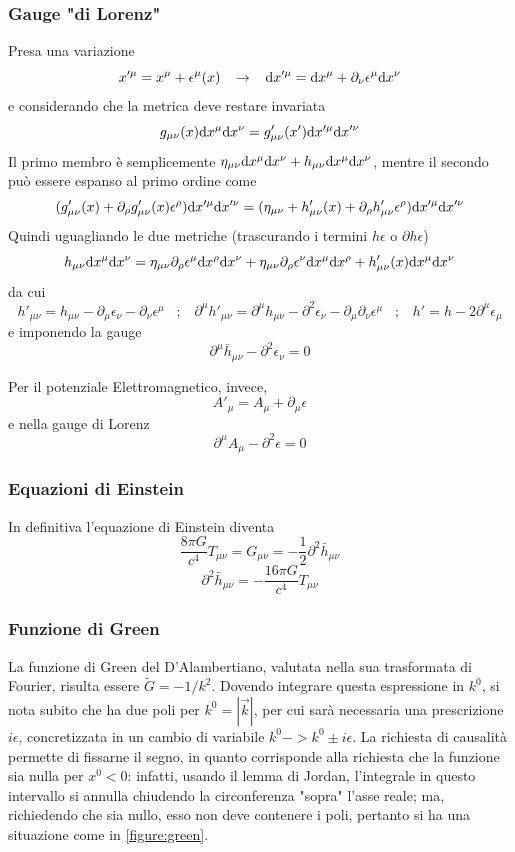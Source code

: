 \subsubsection{Gauge "di Lorenz"}
Presa una variazione
\[ x'^\mu = x^\mu +\epsilon^\mu(x) \;\;\;\rightarrow \;\;\; \mathrm{d} x'^\mu = \mathrm{d} x^\mu + \partial_\nu \epsilon^\mu \mathrm{d} x^\nu \]
e considerando che la metrica deve restare invariata
\[ g_{\mu\nu}(x)\mathrm{d} x^\mu\mathrm{d} x^\nu = g'_{\mu\nu}(x')\mathrm{d} x'^\mu\mathrm{d} x'^\nu \]
Il primo membro \`e semplicemente \( \eta_{\mu\nu} \mathrm{d} x^\mu\mathrm{d} x^\nu + h_{\mu\nu} \mathrm{d} x^\mu\mathrm{d} x^\nu \), mentre il secondo pu\`o essere espanso al primo ordine come
\[ (g'_{\mu\nu}(x)+\partial_\rho g'_{\mu\nu}(x) \epsilon^\rho)  \mathrm{d} x'^\mu\mathrm{d} x'^\nu = (\eta_{\mu\nu} + h'_{\mu\nu}(x) + \partial_\rho h'_{\mu\nu} \epsilon^\rho) \mathrm{d} x'^\mu\mathrm{d} x'^\nu \]
Quindi uguagliando le due metriche (trascurando i termini $h\epsilon$ o $\partial h\epsilon$)
\[ h_{\mu\nu} \mathrm{d} x^\mu\mathrm{d} x^\nu = \eta_{\mu\nu} \partial_\rho \epsilon^\mu \mathrm{d} x^\rho \mathrm{d} x^\nu + 
                               \eta_{\mu\nu} \partial_\rho \epsilon^\nu \mathrm{d} x^\mu \mathrm{d} x^\rho + 
			       h'_{\mu\nu}(x) \mathrm{d} x^\mu\mathrm{d} x^\nu \]
da cui
\[ h'_{\mu\nu} = h_{\mu\nu} -  \partial_\mu \epsilon_\nu - \partial_\nu \epsilon^\mu \;\;\;;\;\;\;
	\partial^\mu h'_{\mu\nu} = \partial^\mu h_{\mu\nu} - \partial^2 \epsilon_\nu - \partial_\mu \partial_\nu \epsilon^\mu \;\;\;;\;\;\;
	h' = h - 2\partial^\mu \epsilon_\mu \]
e imponendo la gauge
\[ \partial^\mu \bar{h}_{\mu\nu} - \partial^2\epsilon_\nu =0 \]

Per il potenziale Elettromagnetico, invece, 
\[ A'_\mu = A_\mu + \partial_\mu \epsilon \]
e nella gauge di Lorenz
\[ \partial^\mu A_\mu - \partial^2 \epsilon = 0 \]


\subsubsection{Equazioni di Einstein}
In definitiva l'equazione di Einstein diventa
\[ \frac{8\pi G}{c^4} T_{\mu\nu} = G_{\mu\nu} = -\frac{1}{2} \partial^2 \bar{h}_{\mu\nu} \]
\begin{equation} \label{eq:einst_lin}
	\partial^2 \bar{h}_{\mu\nu} = -\frac{16\pi G}{c^4} T_{\mu\nu} 
\end{equation}

\subsubsection{Funzione di Green}
La funzione di Green del D'Alambertiano, valutata nella sua trasformata di Fourier, risulta essere \( \tilde{G} =- 1/k^2 \). Dovendo integrare questa espressione in $k^0$, si nota subito che ha due poli per \( k^0 = |\vec{k}| \), per cui sar\`a necessaria una prescrizione $i\epsilon$, concretizzata in un cambio di variabile \( k^0 -> k^0 \pm i\epsilon \). La richiesta di causalit\`a permette di fissarne il segno, in quanto corrisponde alla richiesta che la funzione sia nulla per \( x^0 < 0\):  infatti, usando il lemma di Jordan, l'integrale in questo intervallo si annulla chiudendo la circonferenza "sopra" l'asse reale; ma, richiedendo che sia nullo, esso non deve contenere i poli, pertanto si ha una situazione come in \ref{figure:green}.


